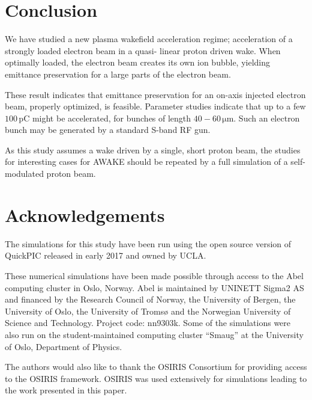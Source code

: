 \documentclass[aps,prstab,reprint,amsmath,amssymb,groupedaddress]{revtex4-1}
\newcommand{\unit}[1]{\,\mathrm{#1}}
\begin{document}
\section{Conclusion}\label{S:C}

We have studied a new plasma wakefield acceleration regime; acceleration of a strongly loaded electron beam in a quasi-
linear proton driven wake. When optimally loaded, the electron beam creates its own ion bubble, yielding emittance
preservation for a large parts of the electron beam.

These result indicates that emittance preservation for an on-axis injected electron beam, properly optimized, is
feasible. Parameter studies indicate that up to a few $100\unit{pC}$ might be accelerated, for bunches of length
$40-60\unit{\mu m}$. Such an electron bunch may be generated by a standard S-band RF gun.

As this study assumes a wake driven by a single, short proton beam, the studies for interesting cases for AWAKE should
be repeated by a full simulation of a self-modulated proton beam.

\section{Acknowledgements}\label{Ack}

The simulations for this study have been run using the open source version of QuickPIC released in early 2017 and owned
by UCLA.

These numerical simulations have been made possible through access to the Abel computing cluster in Oslo, Norway. Abel
is maintained by UNINETT Sigma2 AS and financed by the Research Council of Norway, the University of Bergen, the
University of Oslo, the University of Tromsø and the Norwegian University of Science and Technology. Project code:
nn9303k. Some of the simulations were also run on the student-maintained computing cluster ``Smaug'' at the University
of Oslo, Department of Physics.

The authors would also like to thank the OSIRIS Consortium for providing access to the OSIRIS framework. OSIRIS was used
extensively for simulations leading to the work presented in this paper.


\end{document}

